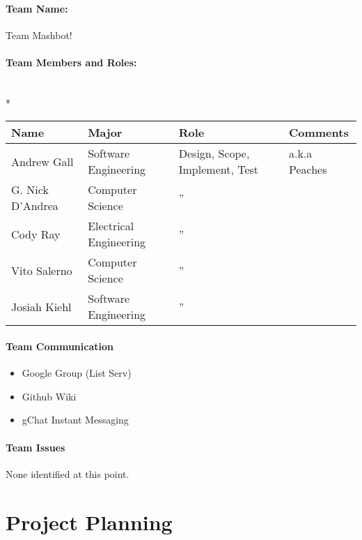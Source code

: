 \documentclass{article}
\begin{document}
\paragraph{Team Name:} Team Mashbot!
\paragraph{Team Members and Roles:} \hspace*{\fill} \\*
\begin{tabular}{|l|l|l|l|}
\hline
Name & Major & Role & Comments \\ \hline
Andrew Gall & Software Engineering & Design, Scope, Implement, Test & a.k.a Peaches \\ \hline
G. Nick D'Andrea & Computer Science & \hspace*{\fill}''\hspace*{\fill} &  \\ \hline
Cody Ray & Electrical Engineering & \hspace*{\fill}''\hspace*{\fill} &  \\ \hline
Vito Salerno & Computer Science & \hspace*{\fill}''\hspace*{\fill} &  \\ \hline
Josiah Kiehl & Software Engineering & \hspace*{\fill}''\hspace*{\fill} & \\ \hline
\end{tabular}

\paragraph{Team Communication}
\begin{itemize}
  \item Google Group (List Serv)
  \item Github Wiki
  \item gChat Instant Messaging
\end{itemize}
\paragraph{Team Issues}

None identified at this point.

\section*{Project Planning}
\end{document}
